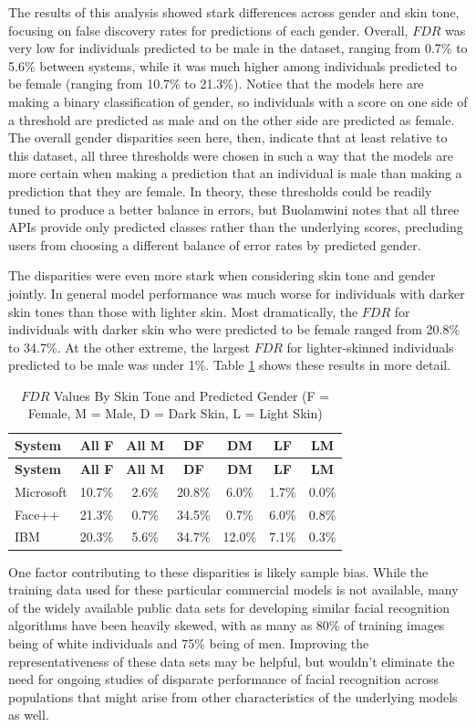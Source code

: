 \documentclass[]{krantz}
\begin{document}
The results of this analysis showed stark differences across gender and
skin tone, focusing on false discovery rates for predictions of each
gender. Overall, \(FDR\) was very low for individuals predicted to be
male in the dataset, ranging from 0.7\% to 5.6\% between systems, while
it was much higher among individuals predicted to be female (ranging
from 10.7\% to 21.3\%). Notice that the models here are making a binary
classification of gender, so individuals with a score on one side of a
threshold are predicted as male and on the other side are predicted as
female. The overall gender disparities seen here, then, indicate that at
least relative to this dataset, all three thresholds were chosen in such
a way that the models are more certain when making a prediction that an
individual is male than making a prediction that they are female. In
theory, these thresholds could be readily tuned to produce a better
balance in errors, but Buolamwini notes that all three APIs provide only
predicted classes rather than the underlying scores, precluding users
from choosing a different balance of error rates by predicted gender.

The disparities were even more stark when considering skin tone and
gender jointly. In general model performance was much worse for
individuals with darker skin tones than those with lighter skin. Most
dramatically, the \(FDR\) for individuals with darker skin who were
predicted to be female ranged from 20.8\% to 34.7\%. At the other
extreme, the largest \(FDR\) for lighter-skinned individuals predicted
to be male was under 1\%. Table \ref{tab:facialrectable} shows these
results in more detail.

\begin{longtable}[]{@{}lcccccc@{}}
\caption{\label{tab:facialrectable} \(FDR\) Values By Skin Tone and
Predicted Gender (F = Female, M = Male, D = Dark Skin, L = Light
Skin)}\tabularnewline
\toprule
\textbf{System} & \textbf{All F} & \textbf{All M} & \textbf{DF} &
\textbf{DM} & \textbf{LF} & \textbf{LM}\tabularnewline
\midrule
\endfirsthead
\toprule
\textbf{System} & \textbf{All F} & \textbf{All M} & \textbf{DF} &
\textbf{DM} & \textbf{LF} & \textbf{LM}\tabularnewline
\midrule
\endhead
Microsoft & 10.7\% & 2.6\% & 20.8\% & 6.0\% & 1.7\% &
0.0\%\tabularnewline
Face++ & 21.3\% & 0.7\% & 34.5\% & 0.7\% & 6.0\% & 0.8\%\tabularnewline
IBM & 20.3\% & 5.6\% & 34.7\% & 12.0\% & 7.1\% & 0.3\%\tabularnewline
\bottomrule
\end{longtable}

One factor contributing to these disparities is likely sample bias.
While the training data used for these particular commercial models is
not available, many of the widely available public data sets for
developing similar facial recognition algorithms have been heavily
skewed, with as many as 80\% of training images being of white
individuals and 75\% being of men. Improving the representativeness of
these data sets may be helpful, but wouldn't eliminate the need for
ongoing studies of disparate performance of facial recognition across
populations that might arise from other characteristics of the
underlying models as well.
\end{document}

